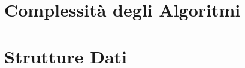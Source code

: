 



\begin{multicols}{2}

\section*{Complessità degli Algoritmi}


\columnbreak %

\section*{Strutture Dati}


% 

\end{multicols}

